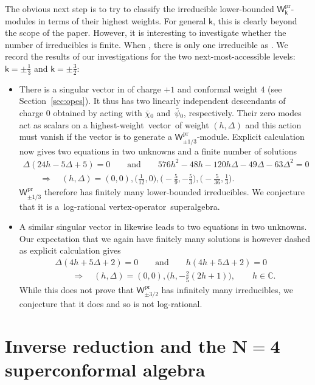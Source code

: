 \documentclass[pdftex]{sigma}
\numberwithin{equation}{section}
\newcommand{\bchi}{\bar{\chi}{}} %
\newcommand{\bpsi}{\bar{\psi}{}} %
\newcommand{\kk}{\mathsf{k}} %
\newcommand{\Ra}{\Rightarrow}
\newcommand{\fld}[1]{\mathbb{#1}} %
\newcommand{\VOA}[1]{\mathsf{#1}} %
\newcommand{\CC}{\fld{C}}
\newcommand{\sfsymb}{\VOA{SF}}
\newcommand{\sfvoa}{\sfsymb} %
\newcommand{\uwalg}[2]{\VOA{W}^{#1}_{\mathrm{#2}}} %
\newcommand{\swalg}[2]{\VOA{W}_{#1}^{\mathrm{#2}}} %
\newcommand{\upr}[1][\kk]{\uwalg{#1}{pr}} %
\newcommand{\spr}[1][\kk]{\swalg{#1}{pr}} %
\newcommand{\hw}{highest-weight}
\newcommand{\hwv}{\hw\ vector}
\newcommand{\vo}{vertex-operator}
\newcommand{\svoa}{\vo\ superalgebra}
\begin{document}
The obvious next step is to try to classify the irreducible lower-bounded $\spr$-modules in terms of their highest weights.
For general $\kk$, this is clearly beyond the scope of the paper.
However, it is interesting to investigate whether the number of irreducibles is finite.
When \smash{$\kk=\pm\frac{1}{2}$}, there is only one irreducible as \smash{$\spr[\pm1/2] \cong \sfvoa$}.
We record the results of our investigations for the two next-most-accessible levels: $\kk=\pm\frac{1}{3}$ and $\kk=\pm\frac{3}{2}$:
\begin{itemize}\itemsep=0pt
 \item There is a singular vector in \smash{$\upr[\pm1/3]$} of charge $+1$ and conformal weight $4$ (see Section~\ref{sec:opes}).
 It thus has two linearly independent descendants of charge $0$ obtained by acting with $\bchi_0$ and~$\bpsi_0$, respectively.
 Their zero modes act as scalars on a \hwv\ of weight $(h,\Delta)$ and this action must vanish if the vector is to generate a $\spr[\pm1/3]$-module.
 Explicit calculation now gives two equations in two unknowns and a finite number of solutions
 \begin{gather*}
 \Delta (24h - 5\Delta + 5) = 0 \qquad \text{and} \qquad
 576h^2 - 48h - 120h\Delta - 49\Delta - 63\Delta^2 = 0 \\
 \qquad\Ra \quad (h,\Delta) = (0,0),\bigl(\tfrac{1}{12},0\bigr),\bigl(-\tfrac{5}{9},-\tfrac{5}{3}\bigr),\bigl(-\tfrac{5}{36},\tfrac{1}{3}\bigr).
 \end{gather*}
 $\spr[\pm1/3]$ therefore has finitely many lower-bounded irreducibles.
 We conjecture that it is a~log-rational \svoa.
 \item A similar singular vector in \smash{$\upr[\pm3/2]$} likewise leads to two equations in two unknowns.
 Our expectation that we again have finitely many solutions is however dashed as explicit calculation gives
 \begin{gather*}
 \Delta (4h + 5\Delta + 2) = 0 \qquad \text{and} \qquad
 h (4h + 5\Delta + 2) = 0 \\
 \qquad \Ra \quad (h,\Delta) = (0,0), \bigl(h,-\tfrac{2}{5}(2h+1)\bigr), \qquad h \in \CC.
 \end{gather*}
 While this does not prove that $\spr[\pm3/2]$ has infinitely many irreducibles, we conjecture that it does and so is not log-rational.
\end{itemize}

\section[Inverse reduction and the N=4 superconformal algebra]{Inverse reduction and the $\boldsymbol{N=4}$ superconformal algebra} \label{sec:InvRed}
\end{document}
